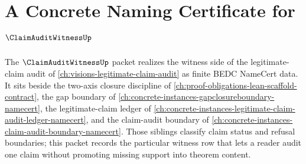 \chapter{A Concrete Naming Certificate for $\ClaimAuditWitnessUp$}
\label{ch:concrete-instances-claim-audit-witness-namecert}

The $\ClaimAuditWitnessUp$ packet realizes the witness side of the legitimate-claim audit of \autoref{ch:visions-legitimate-claim-audit} as finite BEDC NameCert data. It sits beside the two-axis closure discipline of \autoref{ch:proof-obligations-lean-scaffold-contract}, the gap boundary of \autoref{ch:concrete-instances-gapclosureboundary-namecert}, the legitimate-claim ledger of \autoref{ch:concrete-instances-legitimate-claim-audit-ledger-namecert}, and the claim-audit boundary of \autoref{ch:concrete-instances-claim-audit-boundary-namecert}. Those siblings classify claim status and refusal boundaries; this packet records the particular witness row that lets a reader audit one claim without promoting missing support into theorem content.

